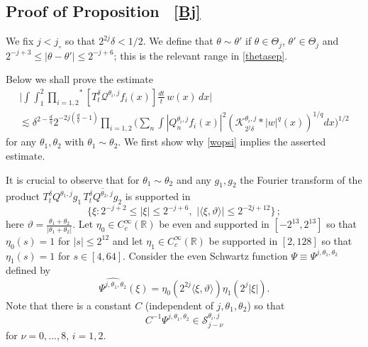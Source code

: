 \documentclass[11pt]{amsart}
\theoremstyle{definition}
\numberwithin{theorem}{section}
\numberwithin{definition}{section}
\def\prodstar{{\prod_{i=1,2}}^{\!\!*}}
\def\inn#1#2{\langle#1,#2\rangle}
\newcommand{\note}[1]{\footnote{\texttt{\Small #1}}}
\def\vth{\vartheta}
\def\inn#1#2{\langle#1,#2\rangle}
\def\lc{\lesssim}
\def\bbR{{\mathbb {R}}}
\def\cK{{\mathcal {K}}}
\def\cQ{{\mathcal {Q}}}
\def\cS{{\mathcal {S}}}
\begin{document}
\subsection*{Proof of Proposition ~\ref{Bj}}
We fix $j<j_\circ$ so that $2^{2j}\delta < 1/2$.
We define that  $\theta\sim \theta'$ if $\theta\in \Theta_j$,
$\theta'\in \Theta_j$ and $2^{-j+3}\le |\theta-\theta'|\le 2^{-j+6}$; this is the relevant range in \eqref{thetasep}.


Below we shall prove the estimate
\begin{multline} \label{wopsi}
\Big|\int\int_1^2\prodstar [T^\delta_t \cQ^{\theta_i,j} f_i(x)]
 \frac{dt}{t}\,
w(x) \, dx\Big|
\\ \lc
\delta^{2-\frac dq} 2^{-2j (\frac{d}{q}-1)}\prod_{i=1,2} \Big(\sum_n\int
|Q^{\theta_i,j}_nf_i(x)|^2  (\cK^{\theta_i,j}_{2^j\delta}* |w|^q(x))^{1/q} dx\Big)^{1/2}
\end{multline}
for any  $\theta_1, \theta_2$ with $\theta_1\sim\theta_2$.
We first show why \eqref{wopsi}  implies the asserted estimate.


It is  crucial  to observe that for $\theta_1\sim\theta_2$ and
 any $g_1,g_2$
the Fourier transform of the product
$T^\delta_t Q^{\theta_1,j}g_1\, \overline{T^\delta_t Q^{\theta_2,j}g_2}$
 is supported in
$$\{\xi: 2^{-j+2}\le |\xi|\le 2^{-j+6}, \,\,|\inn\xi \vth|\le 2^{-2j+12}\}\,;$$
here $\vth=\frac{\theta_1+\theta_2}{|\theta_1+\theta_2|}$.
Let $\eta_0\in C^\infty_c(\bbR)$ be even and  supported in $[-2^{13},2^{13}]$
so that $\eta_0(s)=1$ for $|s|\le 2^{12}$ and let
$\eta_1\in C^\infty_c(\bbR)$ be supported in $[2, 128]$ so that  $\eta_1(s)=1$ for $s\in [4, 64]$.
Consider the even  Schwartz function $\Psi\equiv \Psi^{j,\theta_1,\theta_2}$ defined by
$$\widehat {\Psi^{j,\theta_1,\theta_2}}(\xi)= \eta_0(2^{2j}\inn {\xi}{\vth})\eta_1(2^j|\xi|).$$
Note that there is a constant $C$ (independent of $j,\theta_1, \theta_2$) so that
$$C^{-1}\Psi^{j,\theta_1,\theta_2} \in \cS^{\theta_i, j}_{j-\nu}$$
for  $\nu=0,\dots, 8$, $i=1,2$.
\end{document}
